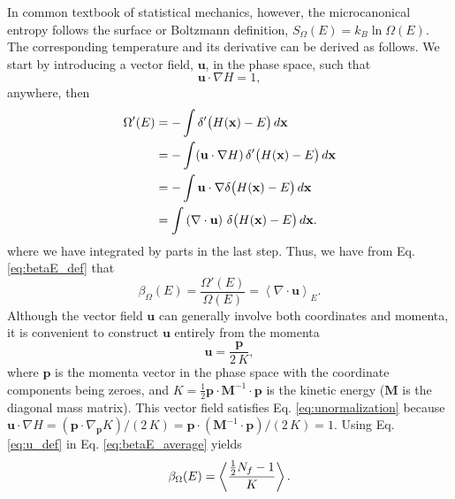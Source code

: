 \documentclass[preprint]{revtex4-1}
\begin{document}
In common textbook of statistical mechanics, however,
the microcanonical entropy
follows the surface or Boltzmann definition\cite{
  pearson1985, cagin1988, becker, dunkel2014, frenkel2015},
$S_\Omega(E) = k_B \ln \Omega(E)$.
%
The corresponding temperature and its derivative
can be derived as follows.
%
We start by introducing a vector field, $\mathbf u$,
in the phase space,
such that
%
\begin{equation}
  \mathbf u \cdot \nabla H = 1
  ,
  \label{eq:unormalization}
\end{equation}
%
anywhere, then
%
\begin{align}
  \Omega'(E)
  &= -\int \delta'\bigl( H(\mathbf x) - E \bigr) \, d\mathbf x
     \notag \\
  &= -\int (\mathbf u \cdot \nabla H) \,
           \delta'\bigl( H(\mathbf x) - E \bigr) \, d\mathbf x
     \notag \\
  &= -\int \mathbf u \cdot
           \nabla \delta\bigl( H(\mathbf x) - E \bigr) \, d\mathbf x
     \notag \\
  &= \int
     \left( \nabla \cdot \mathbf u \right) \,
     \delta\bigl( H(\mathbf x) - E \bigr) \, d\mathbf x
  .
  \notag
\end{align}
%
where we have integrated by parts in the last step.
%
Thus, we have from Eq. \eqref{eq:betaE_def} that
%
\begin{equation}
  \beta_\Omega(E)
  =
  \frac{ \Omega'(E) } { \Omega(E) }
  =
  \left\langle
    \nabla \cdot \mathbf u
  \right\rangle_E
  .
  \label{eq:betaE_average}
\end{equation}
%
Although the vector field $\mathbf u$ can generally
involve both coordinates and momenta,
it is convenient to construct $\mathbf u$
entirely from the momenta
%
\begin{equation}
  \mathbf u
  =
  \frac{ \mathbf p }
       {  2 \, K }
  ,
  \label{eq:u_def}
\end{equation}
where $\mathbf p$ is the momenta vector in the phase space
with the coordinate components being zeroes,
and $K = \frac 1 2 \mathbf p \cdot \mathbf M^{-1} \cdot \mathbf p$
is the kinetic energy ($\mathbf M$ is the diagonal mass matrix).
%
This vector field satisfies Eq. \eqref{eq:unormalization}
because
$\mathbf u \cdot \nabla H
= (\mathbf p \cdot \nabla_{\mathbf p} K)/(2 \, K)
= \mathbf p \cdot (\mathbf M^{-1} \cdot \mathbf p) / (2 \, K) = 1$.
%
Using Eq. \eqref{eq:u_def} in Eq. \eqref{eq:betaE_average}
yields
%
\begin{equation}
  \beta_\Omega(E)
  =
  \left\langle
    \frac{ \frac{1}{2}N_f - 1 } { K }
  \right\rangle
  .
  \notag
\end{equation}
\end{document}
